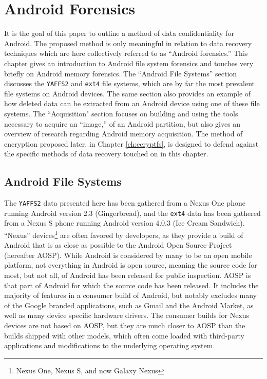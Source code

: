 \chapter{Android Forensics}
\label{ch:forensics}
It is the goal of this paper to outline a method of data confidentiality for Android. The proposed method is only meaningful in
relation to data recovery techniques which are here collectively referred to as ``Android forensics.'' This chapter gives an
introduction to Android file system forensics and touches very briefly on Android memory forensics.  The ``Android File Systems''
section discusses the \texttt{YAFFS2} and \texttt{ext4} file systems, which are by far the most prevalent file systems on Android
devices. The same section also provides an example of how deleted data can be extracted from an Android device using one of
these file systems.  The ``Acquisition" section focuses on building and using the tools necessary to acquire an ``image,'' of an
Android partition, but also gives an overview of research regarding Android memory acquisition. The method of encryption proposed
later, in Chapter \ref{ch:ecryptfs}, is designed to defend against the specific methods of data recovery touched on in this
chapter.

\section{Android File Systems}

The \texttt{YAFFS2} data presented here has been gathered from a Nexus One phone running Android version 2.3 (Gingerbread), and the
\texttt{ext4} data has been gathered from a Nexus S phone running Android version 4.0.3 (Ice Cream Sandwich).  ``Nexus''
devices\footnote{Nexus One, Nexus S, and now Galaxy Nexus} are often favored by developers, as they provide a build of Android that
is as close as possible to the Android Open Source Project (hereafter AOSP). While Android is considered by many to be an open
mobile platform, not everything in Android is open source, meaning the source code for most, but not all, of Android has been
released for public inspection.  AOSP is that part of Android for which the source code has been released.  It includes the majority
of features in a consumer build of Android, but notably excludes many of the Google branded applications, such as Gmail and the
Android Market, as well as many device specific hardware drivers. The consumer builds for Nexus devices are not based on AOSP, but
they are much closer to AOSP than the builds shipped with other models, which often come loaded with third-party applications and
modifications to the underlying operating system.

